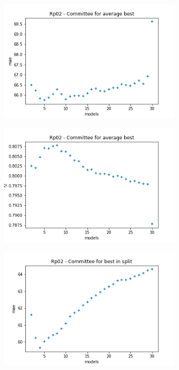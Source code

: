 \begin{figure}
     \centering
     \begin{subfigure}[b]{0.49\textwidth}
         \centering
         \includegraphics[width=\textwidth]{images/Rp02_avg_mae.png}
         \caption{}
         \label{fig:ea-avg-mae-rp02}
     \end{subfigure}
     \begin{subfigure}[b]{0.49\textwidth}
         \centering
         \includegraphics[width=\textwidth]{images/Rp02_avg_r2.png}
         \caption{}
         \label{fig:ea-avg-r2-rp02}
     \end{subfigure}
     \hfill
     \begin{subfigure}[b]{0.49\textwidth}
         \centering
         \includegraphics[width=\textwidth]{images/Rp02_split_mae.png}

\end{subfigure}
\end{figure}
